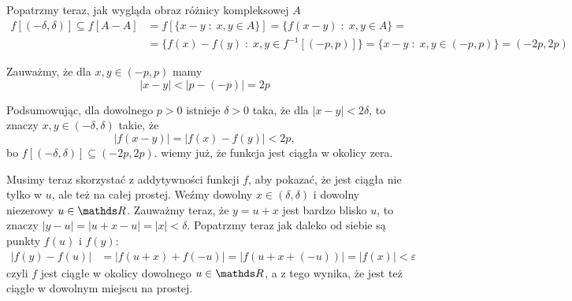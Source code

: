 \documentclass{article}
\begin{document}
Popatrzmy teraz, jak wygląda obraz różnicy kompleksowej $A$
\begin{align*}
    f[(-\delta,\delta)]\subseteq f[A-A]&=f[\{x-y\;:\;x,y\in A\}]=\{f(x-y)\;:\;x,y\in A\}=\\
    &=\{f(x)-f(y)\;:\;x,y\in f^{-1}[(-p,p)]\}=\{x-y\;:\;x,y\in(-p,p)\}=(-2p,2p)
\end{align*}

Zauważmy, że dla $x,y\in(-p,p)$ mamy
$$|x-y|<|p-(-p)|=2p$$

Podsumowując, dla dowolnego $p>0$ istnieje $\delta>0$ taka, że dla $|x-y|<2\delta$, to znaczy $x,y\in(-\delta,\delta)$ takie, że 
$$|f(x-y)|=|f(x)-f(y)|<2p,$$
bo $f[(-\delta,\delta)]\subseteq (-2p,2p)$. wiemy już, że funkcja jest ciągła w okolicy zera.
\smallskip

Musimy teraz skorzystać z addytywności funkcji $f$, aby pokazać, że jest ciągła nie tylko w $u$, ale też na całej prostej. Weźmy dowolny $x\in(\delta,\delta)$ i dowolny niezerowy $u\in\R$. Zauważmy teraz, że $y=u+x$ jest bardzo blisko $u$, to znaczy $|y-u|=|u+x-u|=|x|<\delta$. Popatrzmy teraz jak daleko od siebie są punkty $f(u)$ i $f(y)$:
\begin{align*}
    |f(y)-f(u)|&=|f(u+x)+f(-u)|=|f(u+x+(-u))|=|f(x)|<\varepsilon
\end{align*}
czyli $f$ jest ciągłe w okolicy dowolnego $u\in\R$, a z tego wynika, że jest też ciągłe w dowolnym miejscu na prostej.

\kdowod
\end{document}

